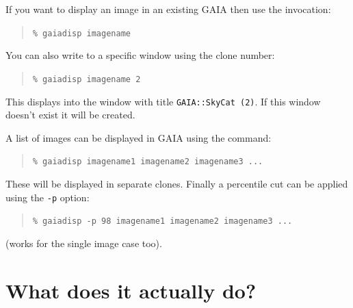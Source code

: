 \documentclass[twoside,11pt]{article}
\newcommand{\xlabel}[1]{}
\renewcommand{\_}{\texttt{\symbol{95}}}
\newcommand{\mytt}[1]{{\texttt{#1}}}
\begin{document}
If you want to display an image in an existing GAIA then use the
invocation:
\begin{quote}
\mytt{\% gaiadisp image\_name}
\end{quote}
You can also write to a specific window using the clone number:
\begin{quote}
\mytt{\% gaiadisp image\_name 2}
\end{quote}
This displays into the window with title \mytt{GAIA::SkyCat (2)}. If
this window doesn't exist it will be created.

A list of images can be displayed in GAIA using the command:
\begin{quote}
\mytt{\% gaiadisp image\_name1 image\_name2 image\_name3 ...}
\end{quote}
These will be displayed in separate clones. Finally a percentile cut
can be applied using the \mytt{-p} option:
\begin{quote}
\mytt{\% gaiadisp -p 98 image\_name1 image\_name2 image\_name3 ...}
\end{quote}
(works for the single image case too).



\section{\xlabel{what_does_it_actually_do}What does it actually do?}
\end{document}
